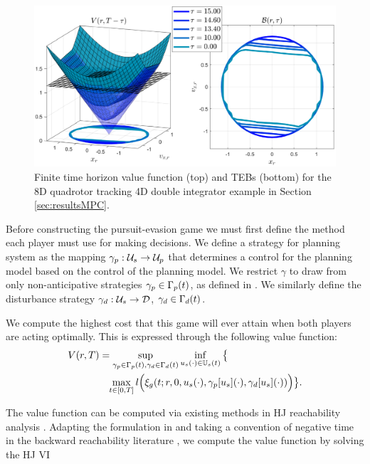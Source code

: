 \begin{figure}
	\centering
  \includegraphics[width=\columnwidth]{fig/tv_valfunc}
  \caption{Finite time horizon value function (top) and TEBs (bottom) for the 8D quadrotor tracking 4D double integrator example in Section \ref{sec:resultsMPC}.}  
  \label{fig:vf_TEB:8D4D}
\end{figure} 

Before constructing the pursuit-evasion game we must first define the method each player must use for making decisions. 
We define a strategy for planning system as the mapping $\gamma_{p} : \mathcal{U}_s \rightarrow \mathcal{U}_p$ that determines a control for the planning model based on the control of the planning model. We restrict $\gamma$ to draw from only non-anticipative strategies $\gamma_{p} \in \Gamma_p(t)$, as defined in \cite{Mitchell05}. 
We similarly define the disturbance strategy $\gamma_{d}: \mathcal{U}_s \rightarrow \mathcal{D}$, $\gamma_{d} \in \Gamma_d(t)$.

We compute the highest cost that this game will ever attain when both players are acting optimally. 
This is expressed through the following value function:
\begin{align}
&V(\rstate,\thor)= \sup_{\gamma_{\pstate} \in \Gamma_\pstate(t), \gamma_{\dstb} \in \Gamma_\dstb(t)} \inf_{\tctrl(\cdot) \in \tcfset(t)} \big\{ \nonumber \\
&\qquad\qquad \max_{\tvar\in [0, \thor]} \errfunc\Big(\rtraj(\tvar; \rstate, 0, \tctrl(\cdot), \gamma_\pstate[\tctrl](\cdot), \gamma_\dstb[\tctrl](\cdot))\Big)\big\}. \label{eq:valfunc}
\end{align} 

The value function can be computed via existing methods in HJ reachability analysis \cite{Mitchell05, Fisac15}.
Adapting the formulation in \cite{Fisac15} and taking a convention of negative time in the backward reachability literature \cite{Chen2016DecouplingJournal, Chen2018}, we compute the value function by solving the HJ VI

